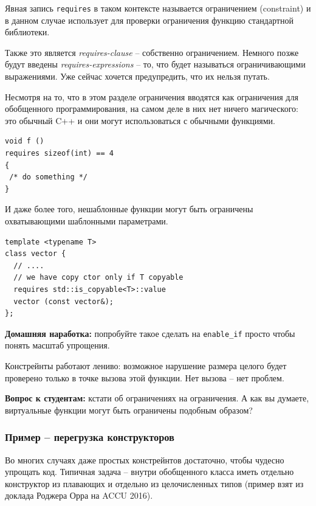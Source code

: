 \documentclass[a4paper,12pt,oneside]{article}
\newif\ifanswers
\begin{document}
Явная запись \lstinline!requires! в таком контексте называется ограничением (constraint) и в данном случае использует для проверки ограничения функцию стандартной библиотеки.

Также это является \textit{requires-clause} -- собственно ограничением. Немного позже будут введены \textit{requires-expressions} -- то, что будет называться ограничивающими выражениями. Уже сейчас хочется предупредить, что их нельзя путать.

Несмотря на то, что в этом разделе ограничения вводятся как ограничения для обобщенного программирования, на самом деле в них нет ничего магического: это обычный C++ и они могут использоваться с обычными функциями.

\begin{lstlisting}
void f ()
requires sizeof(int) == 4
{
 /* do something */
}
\end{lstlisting}

И даже более того, нешаблонные функции могут быть ограничены охватывающими шаблонными параметрами.

\begin{lstlisting}
template <typename T>
class vector {
  // ....
  // we have copy ctor only if T copyable
  requires std::is_copyable<T>::value
  vector (const vector&);
};
\end{lstlisting}

\textbf{Домашняя наработка:} попробуйте такое сделать на \lstinline!enable_if! просто чтобы понять масштаб упрощения.

Констрейнты работают лениво: возможное нарушение размера целого будет проверено только в точке вызова этой функции. Нет вызова -- нет проблем.

\textbf{Вопрос к студентам:} кстати об ограничениях на ограничения. А как вы думаете, виртуальные функции могут быть ограничены подобным образом?

\ifanswers
Правильный ответ: конечно не могут (примерно по тем же причинам, по каким они не могут быть шаблонными). В таблице виртуальных функций просто нет места для этого признака, а связывать его со статическим типом чревато проблемами.
\fi

\subsubsection{Пример -- перегрузка конструкторов}

Во многих случаях даже простых констрейнтов достаточно, чтобы чудесно упрощать код. Типичная задача -- внутри обобщенного класса иметь отдельно конструктор из плавающих и отдельно из целочисленных типов (пример взят из доклада Роджера Орра на ACCU 2016). 
\end{document}
